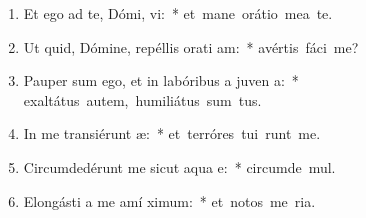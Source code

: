 \begin{flushleft}
\begin{enumerate}[leftmargin=*]
\item Et ego ad te, Dómi, vi:~* \mbox{et mane orátio mea  te.}
\item Ut quid, Dómine, repéllis orati am:~* \mbox{avértis fáci   me?}
\item Pauper sum ego, et in labóribus a juven a:~* \mbox{exaltátus autem, humiliátus sum  tus.}
\item In me transiérunt  æ:~* \mbox{et terróres tui runt me.}
\item Circumdedérunt me sicut aqua  e:~* \mbox{circumde  mul.}
\item Elongásti a me amí  ximum:~* \mbox{et notos me  ria.}

\end{enumerate}
\end{flushleft}

